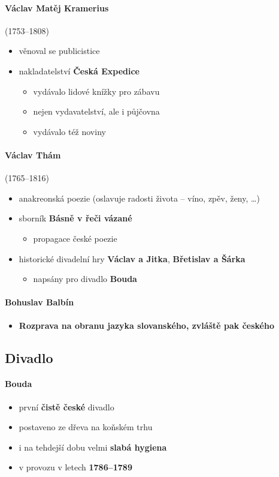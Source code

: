 \paragraph{Václav Matěj Kramerius} (1753--1808)
	\begin{itemize}
	\item věnoval se publicistice
	\item nakladatelství \textbf{Česká Expedice}
		\begin{itemize}
		\item vydávalo lidové knížky pro zábavu
		\item nejen vydavatelství, ale i půjčovna
		\item vydávalo též noviny
		\end{itemize}
	\end{itemize}

\paragraph{Václav Thám} (1765--1816)
\begin{itemize}
\item anakreonská poezie (oslavuje radosti života -- víno, zpěv, ženy, \ldots)
\item sborník \textbf{Básně v řeči vázané}
	\begin{itemize}
	\item propagace české poezie
	\end{itemize}
\item historické divadelní hry \textbf{Václav a Jitka}, \textbf{Břetislav a Šárka}
	\begin{itemize}
	\item napsány pro divadlo \textbf{Bouda}
	\end{itemize}
\end{itemize}

\paragraph{Bohuslav Balbín}
\begin{itemize}
\item \textbf{Rozprava na obranu jazyka slovanského, zvláště pak českého}
\end{itemize}

\subsection{Divadlo}
\paragraph{Bouda}
\begin{itemize}
\item první \textbf{čistě české} divadlo
\item postaveno ze dřeva na koňském trhu 
\item i na tehdejší dobu velmi \textbf{slabá hygiena}
\item v provozu v letech \textbf{1786--1789}
\end{itemize}

